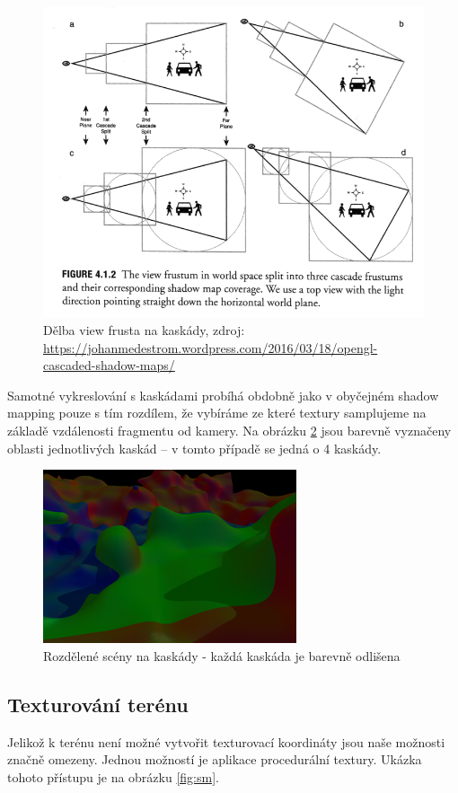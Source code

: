 \documentclass[12pt,a4paper,titlepage,final]{report}
\begin{document}
\begin{figure}[H]
    \centering
    \includegraphics[scale=1.5]{images/cascades.png}
    \caption{Dělba view frusta na kaskády, zdroj: \url{https://johanmedestrom.wordpress.com/2016/03/18/opengl-cascaded-shadow-maps/}}
    \label{fig:casc}
\end{figure}

Samotné vykreslování s kaskádami probíhá obdobně jako v obyčejném shadow mapping pouze s tím rozdílem, že vybíráme ze které textury samplujeme na základě vzdálenosti fragmentu od kamery. Na obrázku \ref{fig:csm} jsou barevně vyznačeny oblasti jednotlivých kaskád -- v tomto případě se jedná o 4 kaskády.

\begin{figure}[H]
    \centering
    \includegraphics[scale=1]{images/csm.png}
    \caption{Rozdělené scény na kaskády - každá kaskáda je barevně odlišena}
    \label{fig:csm}
\end{figure}

\subsection{Texturování terénu}
Jelikož k terénu není možné vytvořit texturovací koordináty jsou naše možnosti značně omezeny. Jednou možností je aplikace procedurální textury. Ukázka tohoto přístupu je na obrázku \ref{fig:sm}.
\end{document}
